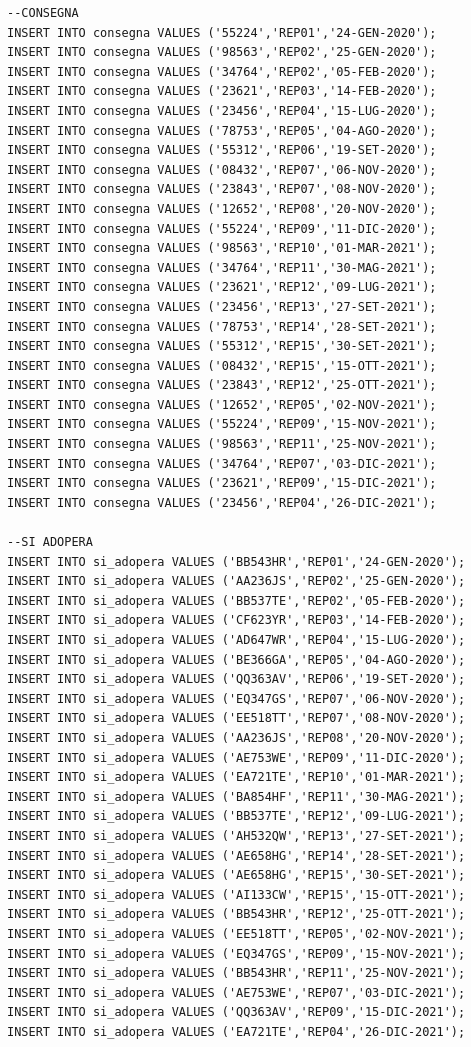 \documentclass[12pt]{report}
\begin{document}
\begin{scriptsize}
\begin{verbatim}
--CONSEGNA
INSERT INTO consegna VALUES ('55224','REP01','24-GEN-2020');
INSERT INTO consegna VALUES ('98563','REP02','25-GEN-2020');
INSERT INTO consegna VALUES ('34764','REP02','05-FEB-2020');
INSERT INTO consegna VALUES ('23621','REP03','14-FEB-2020');
INSERT INTO consegna VALUES ('23456','REP04','15-LUG-2020');
INSERT INTO consegna VALUES ('78753','REP05','04-AGO-2020');
INSERT INTO consegna VALUES ('55312','REP06','19-SET-2020');
INSERT INTO consegna VALUES ('08432','REP07','06-NOV-2020');
INSERT INTO consegna VALUES ('23843','REP07','08-NOV-2020');
INSERT INTO consegna VALUES ('12652','REP08','20-NOV-2020');
INSERT INTO consegna VALUES ('55224','REP09','11-DIC-2020');
INSERT INTO consegna VALUES ('98563','REP10','01-MAR-2021');
INSERT INTO consegna VALUES ('34764','REP11','30-MAG-2021');
INSERT INTO consegna VALUES ('23621','REP12','09-LUG-2021');
INSERT INTO consegna VALUES ('23456','REP13','27-SET-2021');
INSERT INTO consegna VALUES ('78753','REP14','28-SET-2021');
INSERT INTO consegna VALUES ('55312','REP15','30-SET-2021');
INSERT INTO consegna VALUES ('08432','REP15','15-OTT-2021');
INSERT INTO consegna VALUES ('23843','REP12','25-OTT-2021');
INSERT INTO consegna VALUES ('12652','REP05','02-NOV-2021');
INSERT INTO consegna VALUES ('55224','REP09','15-NOV-2021');
INSERT INTO consegna VALUES ('98563','REP11','25-NOV-2021');
INSERT INTO consegna VALUES ('34764','REP07','03-DIC-2021');
INSERT INTO consegna VALUES ('23621','REP09','15-DIC-2021');
INSERT INTO consegna VALUES ('23456','REP04','26-DIC-2021');

--SI ADOPERA
INSERT INTO si_adopera VALUES ('BB543HR','REP01','24-GEN-2020');
INSERT INTO si_adopera VALUES ('AA236JS','REP02','25-GEN-2020');
INSERT INTO si_adopera VALUES ('BB537TE','REP02','05-FEB-2020');
INSERT INTO si_adopera VALUES ('CF623YR','REP03','14-FEB-2020');
INSERT INTO si_adopera VALUES ('AD647WR','REP04','15-LUG-2020');
INSERT INTO si_adopera VALUES ('BE366GA','REP05','04-AGO-2020');
INSERT INTO si_adopera VALUES ('QQ363AV','REP06','19-SET-2020');
INSERT INTO si_adopera VALUES ('EQ347GS','REP07','06-NOV-2020');
INSERT INTO si_adopera VALUES ('EE518TT','REP07','08-NOV-2020');
INSERT INTO si_adopera VALUES ('AA236JS','REP08','20-NOV-2020');
INSERT INTO si_adopera VALUES ('AE753WE','REP09','11-DIC-2020');
INSERT INTO si_adopera VALUES ('EA721TE','REP10','01-MAR-2021');
INSERT INTO si_adopera VALUES ('BA854HF','REP11','30-MAG-2021');
INSERT INTO si_adopera VALUES ('BB537TE','REP12','09-LUG-2021');
INSERT INTO si_adopera VALUES ('AH532QW','REP13','27-SET-2021');
INSERT INTO si_adopera VALUES ('AE658HG','REP14','28-SET-2021');
INSERT INTO si_adopera VALUES ('AE658HG','REP15','30-SET-2021');
INSERT INTO si_adopera VALUES ('AI133CW','REP15','15-OTT-2021');
INSERT INTO si_adopera VALUES ('BB543HR','REP12','25-OTT-2021');
INSERT INTO si_adopera VALUES ('EE518TT','REP05','02-NOV-2021');
INSERT INTO si_adopera VALUES ('EQ347GS','REP09','15-NOV-2021');
INSERT INTO si_adopera VALUES ('BB543HR','REP11','25-NOV-2021');
INSERT INTO si_adopera VALUES ('AE753WE','REP07','03-DIC-2021');
INSERT INTO si_adopera VALUES ('QQ363AV','REP09','15-DIC-2021');
INSERT INTO si_adopera VALUES ('EA721TE','REP04','26-DIC-2021');


\end{verbatim}
\end{scriptsize}
\end{document}
